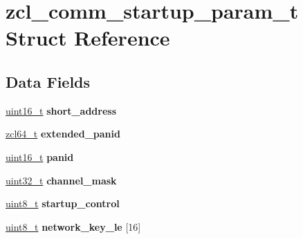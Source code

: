 \hypertarget{structzcl__comm__startup__param__t}{\section{zcl\-\_\-comm\-\_\-startup\-\_\-param\-\_\-t Struct Reference}
\label{structzcl__comm__startup__param__t}
}
\subsection*{Data Fields}
\begin{DoxyCompactItemize}
\item 
\hypertarget{group__zcl__commissioning_ga46b7cb3df8b01ef7189662d2646332a6}{\hyperlink{group__hal_ga5a8b2dc9e45a9ee81a94ef304fb62505}{uint16\-\_\-t} {\bfseries short\-\_\-address}}\label{group__zcl__commissioning_ga46b7cb3df8b01ef7189662d2646332a6}

\item 
\hypertarget{group__zcl__commissioning_ga69dbf2aa384fc28a2d4a1a032cf2857f}{\hyperlink{group__zcl__64_ga2e906cb47fc172ae60da5178075dd3c7}{zcl64\-\_\-t} {\bfseries extended\-\_\-panid}}\label{group__zcl__commissioning_ga69dbf2aa384fc28a2d4a1a032cf2857f}

\item 
\hypertarget{group__zcl__commissioning_gafda9f3228971f93bd96dcf5aee89e35c}{\hyperlink{group__hal_ga5a8b2dc9e45a9ee81a94ef304fb62505}{uint16\-\_\-t} {\bfseries panid}}\label{group__zcl__commissioning_gafda9f3228971f93bd96dcf5aee89e35c}

\item 
\hypertarget{group__zcl__commissioning_ga4e2708bc7022dbf8177e7ef6698ad7d7}{\hyperlink{group__hal__dos_ga09a1e304d66d35dd47daffee9731edaa}{uint32\-\_\-t} {\bfseries channel\-\_\-mask}}\label{group__zcl__commissioning_ga4e2708bc7022dbf8177e7ef6698ad7d7}

\item 
\hypertarget{group__zcl__commissioning_ga959afae272eb1d7a12fad05cb5e55ec7}{\hyperlink{group__hal_gae1affc9ca37cfb624959c866a73f83c2}{uint8\-\_\-t} {\bfseries startup\-\_\-control}}\label{group__zcl__commissioning_ga959afae272eb1d7a12fad05cb5e55ec7}

\item 
\hypertarget{group__zcl__commissioning_gaa59a87bcbd9ac5eb09bcfd68b288cb13}{\hyperlink{group__hal_gae1affc9ca37cfb624959c866a73f83c2}{uint8\-\_\-t} {\bfseries network\-\_\-key\-\_\-le} \mbox{[}16\mbox{]}}\label{group__zcl__commissioning_gaa59a87bcbd9ac5eb09bcfd68b288cb13}


\end{DoxyCompactItemize}
